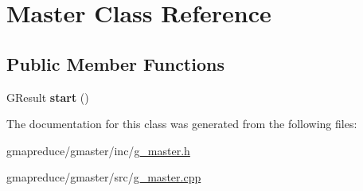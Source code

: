 \hypertarget{class_master}{\section{Master Class Reference}
\label{class_master}
}
\subsection*{Public Member Functions}
\begin{DoxyCompactItemize}
\item 
\hypertarget{class_master_a504ec6cdb9654955f5010301efff9a0d}{G\-Result {\bfseries start} ()}\label{class_master_a504ec6cdb9654955f5010301efff9a0d}

\end{DoxyCompactItemize}


The documentation for this class was generated from the following files\-:\begin{DoxyCompactItemize}
\item 
gmapreduce/gmaster/inc/\hyperlink{g__master_8h}{g\-\_\-master.\-h}\item 
gmapreduce/gmaster/src/\hyperlink{g__master_8cpp}{g\-\_\-master.\-cpp}\end{DoxyCompactItemize}
